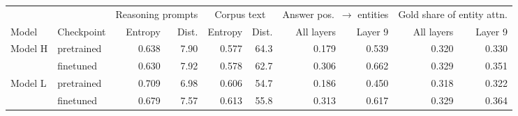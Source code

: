 \begin{tabular}{llrrrrrrrr}
\toprule
& & \multicolumn{2}{c}{Reasoning prompts} & \multicolumn{2}{c}{Corpus text} & \multicolumn{2}{c}{Answer pos.\ $\to$ entities} & \multicolumn{2}{c}{Gold share of entity attn.} \\
\cmidrule(lr){3-4}\cmidrule(lr){5-6}\cmidrule(lr){7-8}\cmidrule(lr){9-10}
Model & Checkpoint & Entropy & Dist. & Entropy & Dist. & All layers & Layer 9 & All layers & Layer 9 \\
\midrule
Model H & pretrained & 0.638 & 7.90 & 0.577 & 64.3 & 0.179 & 0.539 & 0.320 & 0.330 \\
 & finetuned & 0.630 & 7.92 & 0.578 & 62.7 & 0.306 & 0.662 & 0.329 & 0.351 \\
\midrule
Model L & pretrained & 0.709 & 6.98 & 0.606 & 54.7 & 0.186 & 0.450 & 0.318 & 0.322 \\
 & finetuned & 0.679 & 7.57 & 0.613 & 55.8 & 0.313 & 0.617 & 0.329 & 0.364 \\
\bottomrule
\end{tabular}
